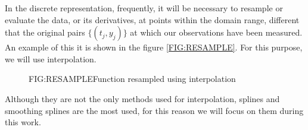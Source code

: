 
In the discrete representation, frequently, it will be necessary to resample or
evaluate the data, or its derivatives, at points within the domain range,
different that the original pairs $\{(t_j, y_j)\}$ at which our observations
have been measured. An example of this it is shown in the figure
\ref{FIG:RESAMPLE}. For this purpose, we will use interpolation.

\begin{figure}[Function resampled using interpolation]{FIG:RESAMPLE}{Function resampled using interpolation}

   \quad
\end{figure}

Although they are not the only methods used for interpolation, splines and
smoothing splines are the most used, for this reason we will focus on them
during this work.
